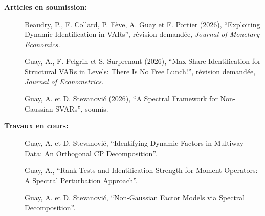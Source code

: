 %
%
\centerline{\bf Articles en soumission:}
\vspace{.2 cm}
%
\begin{description}

\item[] Beaudry, P., F. Collard, P. F\`eve, A. Guay et F. Portier (2026), ``Exploiting Dynamic Identification in VARs'', r\'evision demand\'ee, {\it Journal of Monetary Economics.}



\item[] Guay, A., F. Pelgrin et S. Surprenant (2026), ``Max Share Identification for Structural VARs in Levels: There Is No Free Lunch!'', r\'evision demand\'ee, {\it Journal of Econometrics.}

\item[] Guay, A. et D. Stevanovi\'c (2026), ``A Spectral Framework for Non-Gaussian SVARs'', soumis.

\end{description}

\vspace{.3cm}

\centerline{\bf Travaux en cours:}
\vspace{.2 cm}

\begin{description}

\item[] Guay, A. et D. Stevanovi\'c, ``Identifying Dynamic Factors in Multiway Data: An Orthogonal CP Decomposition''.

\item[] Guay, A., ``Rank Tests and Identification Strength for Moment Operators: A Spectral Perturbation Approach''.

\item[] Guay, A. et D. Stevanovi\'c, ``Non-Gaussian Factor Models via Spectral Decomposition''.




\end{description}






